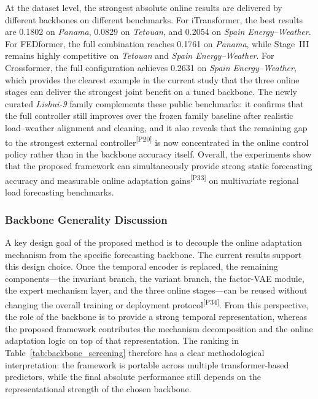 ﻿\documentclass[journal]{IEEEtran}
\DeclareRobustCommand{\auditbad}[2]{{\color{auditred}#1}{\color{auditred}\textsuperscript{[#2]}}}
\begin{document}
At the dataset level, the strongest absolute online results are delivered by different backbones on different benchmarks. For iTransformer, the best results are 0.1802 on \textit{Panama}, 0.0829 on \textit{Tetouan}, and 0.2054 on \textit{Spain Energy--Weather}. For FEDformer, the full combination reaches 0.1761 on \textit{Panama}, while Stage~III remains highly competitive on \textit{Tetouan} and \textit{Spain Energy--Weather}. For Crossformer, the full configuration achieves 0.2631 on \textit{Spain Energy--Weather}, which provides the clearest example in the current study that the three online stages can deliver the strongest joint benefit on a tuned backbone. The newly curated \textit{Lishui-9} family complements these public benchmarks: it confirms that the full controller still improves over the frozen family baseline after realistic load--weather alignment and cleaning, and it also reveals that the remaining gap to the \auditbad{strongest external controller}{P20} is now concentrated in the online control policy rather than in the backbone accuracy itself. Overall, the experiments show that the proposed framework can \auditbad{simultaneously provide strong static forecasting accuracy and measurable online adaptation gains}{P33} on multivariate regional load forecasting benchmarks.

\subsubsection{Backbone Generality Discussion}
A key design goal of the proposed method is to decouple the online adaptation mechanism from the specific forecasting backbone. The current results support this design choice. Once the temporal encoder is replaced, the remaining components---the invariant branch, the variant branch, the factor-VAE module, the expert mechanism layer, and the three online stages---can be reused without changing the overall \auditbad{training or deployment protocol}{P34}. From this perspective, the role of the backbone is to provide a strong temporal representation, whereas the proposed framework contributes the mechanism decomposition and the online adaptation logic on top of that representation. The ranking in Table~\ref{tab:backbone_screening} therefore has a clear methodological interpretation: the framework is portable across multiple transformer-based predictors, while the final absolute performance still depends on the representational strength of the chosen backbone.
\end{document}

